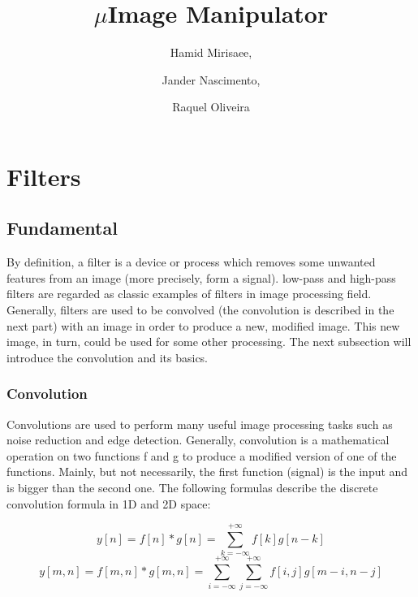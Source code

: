 \documentclass{article}
\begin{document}
\title{$\mu$Image Manipulator}

\author{Hamid Mirisaee,
\and Jander Nascimento, 
\and Raquel Oliveira}

\maketitle

\tableofcontents

\section{Filters}

	\subsection{Fundamental}

		By definition, a filter is a device or process which removes some unwanted features from an image (more precisely, form a signal).
		low-pass and high-pass filters are regarded as  classic examples of filters in image processing field. Generally, filters are used to be convolved 
		(the convolution is described in the next part) with an image in order to produce a new, modified image. This new image, in turn, could
		be used for some other processing. The next subsection will introduce the convolution and its basics.
		
		\subsubsection{Convolution}

			Convolutions are used to perform many useful image processing tasks such as noise reduction and edge detection. Generally,
			convolution is a mathematical operation on two functions f and g to produce a modified version of one of the functions.
			Mainly, but not necessarily, the first function (signal) is the input and is bigger than the second one.
			The following formulas describe the discrete convolution formula in 1D and 2D space:

			\begin{equation}
			y[n] = f[n]*g[n] = \sum_{k=-\infty}^{+\infty} f[k]g[n-k]
			\end{equation}
			\begin{equation}
			y[m,n] = f[m,n]*g[m,n] = \sum_{i=-\infty}^{+\infty}\sum_{j=-\infty}^{+\infty}f[i,j]g[m-i,n-j]
			\end{equation}
\end{document}
